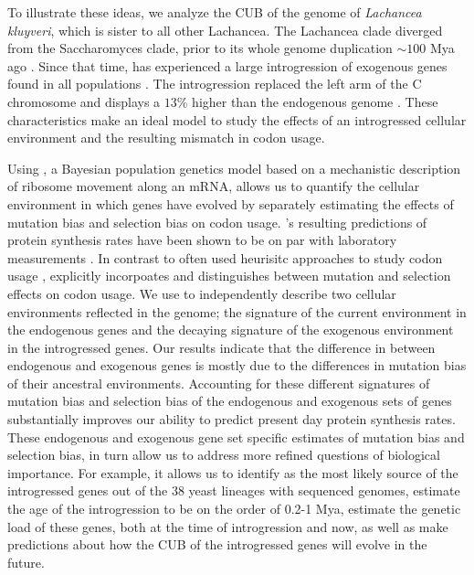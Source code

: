 To illustrate these ideas, we analyze the CUB of the genome of \emph{Lachancea kluyveri}, which is sister to all other Lachancea.
The Lachancea clade diverged from the Saccharomyces clade, prior to its whole genome duplication $\sim 100$ Mya ago \citep{MHM2015,Beimforde2014}.
Since that time, \kluyveri has experienced a large introgression of exogenous genes found in all populations \citep{friedrich2015}.
The introgression replaced the left arm of the C chromosome and displays a $13 \%$ higher \GC than the endogenous \kluyveri genome \citep{payen2009, friedrich2015}.
These characteristics make \kluyveri an ideal model to study the effects of an introgressed cellular environment and the resulting mismatch in codon usage.

Using \ROC, a Bayesian population genetics model based on a mechanistic description of ribosome movement along an mRNA, allows us to quantify the cellular environment in which genes have evolved by separately estimating the effects of mutation bias and selection bias on codon usage.
\ROC's resulting predictions of protein synthesis rates have been shown to be on par with laboratory measurements \citep{ShahAndGilchrist2011, gilchrist2015}.
In contrast to often used heurisitc approaches to study codon usage \citep{sharp1987, dosreis2004}, \ROC explicitly incorpoates and distinguishes between mutation and selection effects on codon usage.
We use \ROC to independently describe two cellular environments reflected in the \kluyveri genome; the signature of the current environment in the endogenous genes and the decaying signature of the exogenous environment in the introgressed genes.
Our results indicate that the difference in \GC between endogenous and exogenous genes is mostly due to the differences in mutation bias of their ancestral environments.
Accounting for these different signatures of mutation bias and selection bias of the endogenous and exogenous sets of genes substantially improves our ability to predict present day protein synthesis rates.
These endogenous and exogenous gene set specific estimates of mutation bias and selection bias, in turn allow us to address more refined questions of biological importance.
For example, it allows us to identify \gossypii as the most likely source of the introgressed genes out of the 38 yeast lineages with sequenced genomes, estimate the age of the introgression to be on the order of 0.2-1 Mya, estimate the genetic load of these genes, both at the time of introgression and now, as well as make predictions about how the CUB of the introgressed genes will evolve in the future.

